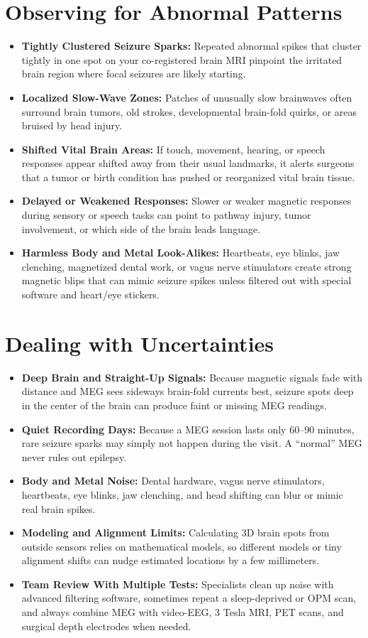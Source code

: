 \section{Observing for Abnormal Patterns}
\begin{itemize}
  \item \textbf{Tightly Clustered Seizure Sparks:} Repeated abnormal spikes that cluster tightly in one spot on your co-registered brain MRI pinpoint the irritated brain region where focal seizures are likely starting.
  \item \textbf{Localized Slow-Wave Zones:} Patches of unusually slow brainwaves often surround brain tumors, old strokes, developmental brain-fold quirks, or areas bruised by head injury.
  \item \textbf{Shifted Vital Brain Areas:} If touch, movement, hearing, or speech responses appear shifted away from their usual landmarks, it alerts surgeons that a tumor or birth condition has pushed or reorganized vital brain tissue.
  \item \textbf{Delayed or Weakened Responses:} Slower or weaker magnetic responses during sensory or speech tasks can point to pathway injury, tumor involvement, or which side of the brain leads language.
  \item \textbf{Harmless Body and Metal Look-Alikes:} Heartbeats, eye blinks, jaw clenching, magnetized dental work, or vagus nerve stimulators create strong magnetic blips that can mimic seizure spikes unless filtered out with special software and heart/eye stickers.
\end{itemize}

\section{Dealing with Uncertainties}
\begin{itemize}
  \item \textbf{Deep Brain and Straight-Up Signals:} Because magnetic signals fade with distance and MEG sees sideways brain-fold currents best, seizure spots deep in the center of the brain can produce faint or missing MEG readings.
  \item \textbf{Quiet Recording Days:} Because a MEG session lasts only 60--90 minutes, rare seizure sparks may simply not happen during the visit. A ``normal'' MEG never rules out epilepsy.
  \item \textbf{Body and Metal Noise:} Dental hardware, vagus nerve stimulators, heartbeats, eye blinks, jaw clenching, and head shifting can blur or mimic real brain spikes.
  \item \textbf{Modeling and Alignment Limits:} Calculating 3D brain spots from outside sensors relies on mathematical models, so different models or tiny alignment shifts can nudge estimated locations by a few millimeters.
  \item \textbf{Team Review With Multiple Tests:} Specialists clean up noise with advanced filtering software, sometimes repeat a sleep-deprived or OPM scan, and always combine MEG with video-EEG, 3 Tesla MRI, PET scans, and surgical depth electrodes when needed.
\end{itemize}

